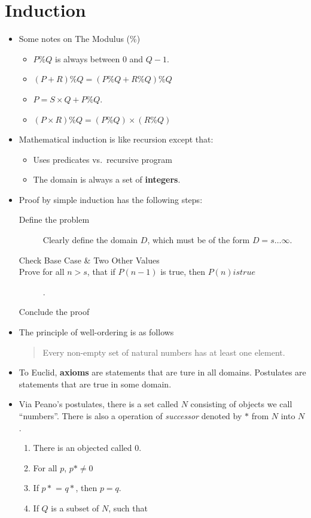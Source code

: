 \documentclass[12pt]{scrartcl}
\begin{document}
\section{Induction}
\begin{itemize}
    \item Some notes on The Modulus (\%)
        \begin{itemize}
            \item $P \% Q$ is always between $0$ and $Q - 1$.
            \item $(P + R) \% Q = (P \% Q + R \% Q) \% Q$
            \item $P = S \times Q + P \% Q$.
            \item $(P \times R) \% Q = (P \% Q) \times (R \% Q)$
        \end{itemize}

    \item Mathematical induction is like recursion except that:
        \begin{itemize}
            \item Uses predicates vs.\ recursive program
            \item The domain is always a set of \textbf{integers}.
        \end{itemize}

    \item Proof by simple induction has the following steps:
        \begin{description}
            \item[Define the problem] Clearly define the domain $D$, which must be of the form $D = s \ldots \infty$.
            \item[Check Base Case \& Two Other Values]
            \item[Prove for all $n > s$, that if $P(n - 1)$ is true, then $P(n) is true$].
            \item[Conclude the proof]
        \end{description}

    \item The principle of well-ordering is as follows

        \begin{quote}
            Every non-empty set of natural numbers has at least one element.
        \end{quote}

    \item To Euclid, \textbf{axioms} are statements that are ture in all domains. Postulates are statements that are true in some domain.
    \item Via Peano's postulates, there is a set called $N$ consisting of objects we call ``numbers''. There is also a operation of \textit{successor} denoted by $*$ from $N$ into $N$.
        \begin{enumerate}
            \item There is an objected called $0$.
            \item For all $p$, $p* \neq 0$
            \item If $p*$ = $q*$, then $p = q$.
            \item If $Q$ is a subset of $N$, such that


\end{enumerate}
\end{itemize}
\end{document}
